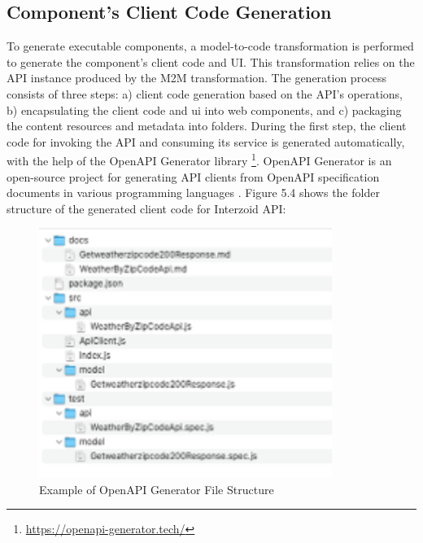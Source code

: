 \vspace{-10pt}
\hypertarget{sec:clientCode-gen}{%
\subsection{Component’s Client Code Generation}\label{sec:clientCode-gen}}
\vspace{10pt} 	

To generate executable components, a model-to-code transformation is performed to generate the component’s client code and UI. This transformation relies on the API instance produced by the M2M transformation. The generation process consists of three steps: a) client code generation based on the API’s operations, b) encapsulating the client code and \gls{ui} into web components, and c) packaging the content resources and metadata into folders. During the first step, the client code for invoking the API and consuming its service is generated automatically, with the help of the OpenAPI Generator library \footnote{\url{https://openapi-generator.tech/}}. OpenAPI Generator is an open-source project for generating API clients from OpenAPI specification documents in various programming languages \autocite{Springborg2022}. Figure 5.4 shows the folder structure of the generated client code for Interzoid API:

\begin{figure}[hbt]
\hypertarget{fig:openapi-generator}{%
\centering
\includegraphics[width=0.85\textwidth]{../figures/MyFigures/Picture 1.png}
\captionsetup{justification=centering}
\caption{Example of OpenAPI Generator File Structure}\label{fig:openapi-generator}
}
\end{figure}

